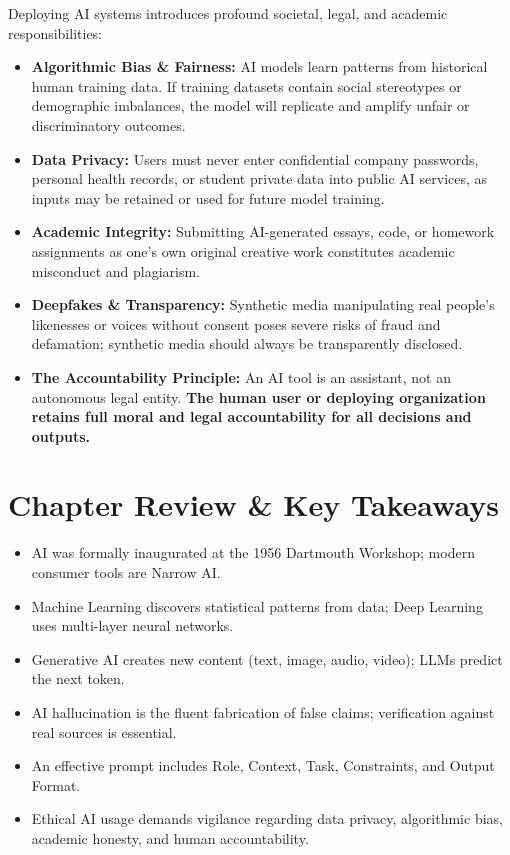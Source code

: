 Deploying AI systems introduces profound societal, legal, and academic responsibilities:
\begin{itemize}[leftmargin=1.2em]
    \item \textbf{Algorithmic Bias \& Fairness:} AI models learn patterns from historical human training data. If training datasets contain social stereotypes or demographic imbalances, the model will replicate and amplify unfair or discriminatory outcomes.
    \item \textbf{Data Privacy:} Users must never enter confidential company passwords, personal health records, or student private data into public AI services, as inputs may be retained or used for future model training.
    \item \textbf{Academic Integrity:} Submitting AI-generated essays, code, or homework assignments as one's own original creative work constitutes academic misconduct and plagiarism.
    \item \textbf{Deepfakes \& Transparency:} Synthetic media manipulating real people's likenesses or voices without consent poses severe risks of fraud and defamation; synthetic media should always be transparently disclosed.
    \item \textbf{The Accountability Principle:} An AI tool is an assistant, not an autonomous legal entity. \textbf{The human user or deploying organization retains full moral and legal accountability for all decisions and outputs.}
\end{itemize}

\section{Chapter Review \& Key Takeaways}
\begin{tcolorbox}[enhanced, colback=boxgreenbg, colframe=boxgreenborder, boxrule=1pt, arc=4pt, title={\bfseries\sffamily Summary Checklist}]
\sffamily\small
\begin{itemize}[leftmargin=1.2em, itemsep=2pt]
    \item AI was formally inaugurated at the 1956 Dartmouth Workshop; modern consumer tools are Narrow AI.
    \item Machine Learning discovers statistical patterns from data; Deep Learning uses multi-layer neural networks.
    \item Generative AI creates new content (text, image, audio, video); LLMs predict the next token.
    \item AI hallucination is the fluent fabrication of false claims; verification against real sources is essential.
    \item An effective prompt includes Role, Context, Task, Constraints, and Output Format.
    \item Ethical AI usage demands vigilance regarding data privacy, algorithmic bias, academic honesty, and human accountability.
\end{itemize}
\end{tcolorbox}
